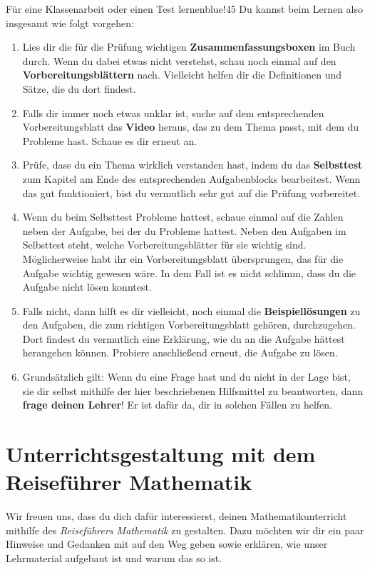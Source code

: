\documentclass[../main.tex]{subfiles}
\begin{document}
\begin{goal}{Für eine Klassenarbeit oder einen Test lernen}{blue!45}
    Du kannst beim Lernen also insgesamt wie folgt vorgehen:
    \begin{enumerate}
        \item[\tikzball{blue!50!black}{1}] Lies dir die für die Prüfung wichtigen \textbf{Zusammenfassungsboxen} im Buch durch. Wenn du dabei etwas nicht verstehst, schau noch einmal auf den \textbf{Vorbereitungsblättern} nach. Vielleicht helfen dir die Definitionen und Sätze, die du dort findest.
        \item[\tikzball{blue!50!black}{2}] Falls dir immer noch etwas unklar ist, suche auf dem entsprechenden Vorbereitungsblatt das \textbf{Video} heraus, das zu dem Thema passt, mit dem du Probleme hast. Schaue es dir erneut an.
        \item[\tikzball{blue!50!black}{3}] Prüfe, dass du ein Thema wirklich verstanden hast, indem du das \textbf{Selbsttest} zum Kapitel am Ende des entsprechenden Aufgabenblocks bearbeitest. Wenn das gut funktioniert, bist du vermutlich sehr gut auf die Prüfung vorbereitet.
        \item[\tikzball{blue!50!black}{4}] Wenn du beim Selbsttest Probleme hattest, schaue einmal auf die Zahlen neben der Aufgabe, bei der du Probleme hattest. Neben den Aufgaben im Selbsttest steht, welche Vorbereitungsblätter für sie wichtig sind. Möglicherweise habt ihr ein Vorbereitungsblatt übersprungen, das für die Aufgabe wichtig gewesen wäre. In dem Fall ist es nicht schlimm, dass du die Aufgabe nicht lösen konntest. 
        \item[\tikzball{blue!50!black}{5}] Falls nicht, dann hilft es dir vielleicht, noch einmal die \textbf{Beispiellösungen} zu den Aufgaben, die zum richtigen Vorbereitungsblatt gehören, durchzugehen. Dort findest du vermutlich eine Erklärung, wie du an die Aufgabe hättest herangehen können. Probiere anschließend erneut, die Aufgabe zu lösen.
        \item[\tikzball{blue!50!black}{6}] Grundsätzlich gilt: Wenn du eine Frage hast und du nicht in der Lage bist, sie dir selbst mithilfe der hier beschriebenen Hilfsmittel zu beantworten, dann \textbf{frage deinen Lehrer}! Er ist dafür da, dir in solchen Fällen zu helfen.
    \end{enumerate}
\end{goal}

\newpage

\section*{Unterrichtsgestaltung mit dem Reiseführer Mathematik}
Wir freuen uns, dass du dich dafür interessierst, deinen Mathematikunterricht mithilfe des \emph{Reiseführers Mathematik} zu gestalten. Dazu möchten wir dir ein paar Hinweise und Gedanken mit auf den Weg geben sowie erklären, wie unser Lehrmaterial aufgebaut ist und warum das so ist.
\end{document}
